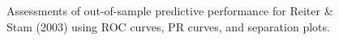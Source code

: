 \begin{figure}
	\centering   
	\caption{Assessments of out-of-sample predictive performance for Reiter \& Stam (2003) using ROC curves, PR curves, and separation plots.}
\end{figure}
\FloatBarrier
\clearpage



% 


